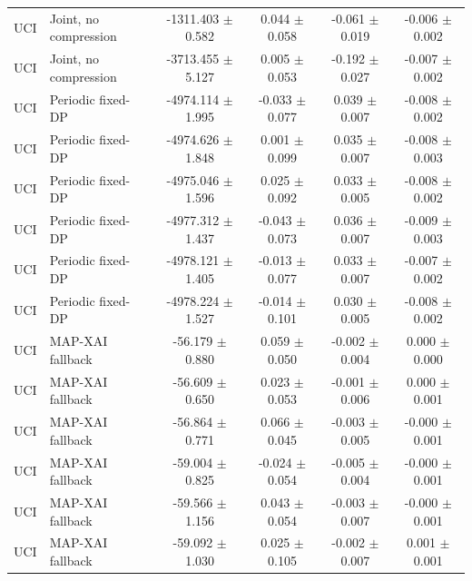 \begin{tabular}{llcccc}
UCI & Joint, no compression & -1311.403 $\pm$ 0.582 & 0.044 $\pm$ 0.058 & -0.061 $\pm$ 0.019 & -0.006 $\pm$ 0.002 \\
UCI & Joint, no compression & -3713.455 $\pm$ 5.127 & 0.005 $\pm$ 0.053 & -0.192 $\pm$ 0.027 & -0.007 $\pm$ 0.002 \\
UCI & Periodic fixed-DP & -4974.114 $\pm$ 1.995 & -0.033 $\pm$ 0.077 & 0.039 $\pm$ 0.007 & -0.008 $\pm$ 0.002 \\
UCI & Periodic fixed-DP & -4974.626 $\pm$ 1.848 & 0.001 $\pm$ 0.099 & 0.035 $\pm$ 0.007 & -0.008 $\pm$ 0.003 \\
UCI & Periodic fixed-DP & -4975.046 $\pm$ 1.596 & 0.025 $\pm$ 0.092 & 0.033 $\pm$ 0.005 & -0.008 $\pm$ 0.002 \\
UCI & Periodic fixed-DP & -4977.312 $\pm$ 1.437 & -0.043 $\pm$ 0.073 & 0.036 $\pm$ 0.007 & -0.009 $\pm$ 0.003 \\
UCI & Periodic fixed-DP & -4978.121 $\pm$ 1.405 & -0.013 $\pm$ 0.077 & 0.033 $\pm$ 0.007 & -0.007 $\pm$ 0.002 \\
UCI & Periodic fixed-DP & -4978.224 $\pm$ 1.527 & -0.014 $\pm$ 0.101 & 0.030 $\pm$ 0.005 & -0.008 $\pm$ 0.002 \\
UCI & MAP-XAI fallback & -56.179 $\pm$ 0.880 & 0.059 $\pm$ 0.050 & -0.002 $\pm$ 0.004 & 0.000 $\pm$ 0.000 \\
UCI & MAP-XAI fallback & -56.609 $\pm$ 0.650 & 0.023 $\pm$ 0.053 & -0.001 $\pm$ 0.006 & 0.000 $\pm$ 0.001 \\
UCI & MAP-XAI fallback & -56.864 $\pm$ 0.771 & 0.066 $\pm$ 0.045 & -0.003 $\pm$ 0.005 & -0.000 $\pm$ 0.001 \\
UCI & MAP-XAI fallback & -59.004 $\pm$ 0.825 & -0.024 $\pm$ 0.054 & -0.005 $\pm$ 0.004 & -0.000 $\pm$ 0.001 \\
UCI & MAP-XAI fallback & -59.566 $\pm$ 1.156 & 0.043 $\pm$ 0.054 & -0.003 $\pm$ 0.007 & -0.000 $\pm$ 0.001 \\
UCI & MAP-XAI fallback & -59.092 $\pm$ 1.030 & 0.025 $\pm$ 0.105 & -0.002 $\pm$ 0.007 & 0.001 $\pm$ 0.001 \\
\bottomrule
\end{tabular}
